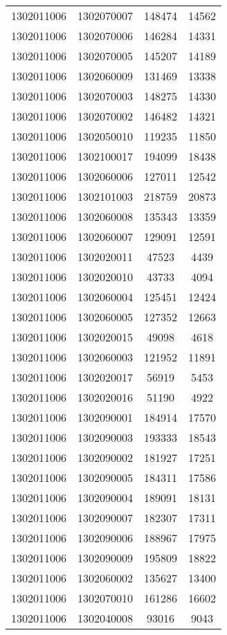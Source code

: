 \begin{longtable}[h]{llcc}
		1302011006 & 1302070007 & 148474 & 14562\\
		1302011006 & 1302070006 & 146284 & 14331\\
		1302011006 & 1302070005 & 145207 & 14189\\
		1302011006 & 1302060009 & 131469 & 13338\\
		1302011006 & 1302070003 & 148275 & 14330\\
		1302011006 & 1302070002 & 146482 & 14321\\
		1302011006 & 1302050010 & 119235 & 11850\\
		1302011006 & 1302100017 & 194099 & 18438\\
		1302011006 & 1302060006 & 127011 & 12542\\
		1302011006 & 1302101003 & 218759 & 20873\\
		1302011006 & 1302060008 & 135343 & 13359\\
		1302011006 & 1302060007 & 129091 & 12591\\
		1302011006 & 1302020011 & 47523 & 4439\\
		1302011006 & 1302020010 & 43733 & 4094\\
		1302011006 & 1302060004 & 125451 & 12424\\
		1302011006 & 1302060005 & 127352 & 12663\\
		1302011006 & 1302020015 & 49098 & 4618\\
		1302011006 & 1302060003 & 121952 & 11891\\
		1302011006 & 1302020017 & 56919 & 5453\\
		1302011006 & 1302020016 & 51190 & 4922\\
		1302011006 & 1302090001 & 184914 & 17570\\
		1302011006 & 1302090003 & 193333 & 18543\\
		1302011006 & 1302090002 & 181927 & 17251\\
		1302011006 & 1302090005 & 184311 & 17586\\
		1302011006 & 1302090004 & 189091 & 18131\\
		1302011006 & 1302090007 & 182307 & 17311\\
		1302011006 & 1302090006 & 188967 & 17975\\
		1302011006 & 1302090009 & 195809 & 18822\\
		1302011006 & 1302060002 & 135627 & 13400\\
		1302011006 & 1302070010 & 161286 & 16602\\
		1302011006 & 1302040008 & 93016 & 9043\\

\end{longtable}
